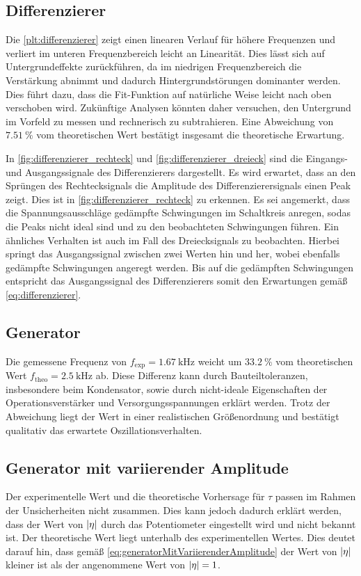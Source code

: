 \subsection{Differenzierer}
\label{sec:Differenzierer_Diskussion}
Die \autoref{plt:differenzierer} zeigt einen linearen Verlauf für höhere Frequenzen und verliert im unteren Frequenzbereich leicht an Linearität.
Dies lässt sich auf Untergrundeffekte zurückführen, da im niedrigen Frequenzbereich die Verstärkung abnimmt und dadurch Hintergrundstörungen dominanter werden.
Dies führt dazu, dass die Fit-Funktion auf natürliche Weise leicht nach oben verschoben wird.
Zukünftige Analysen könnten daher versuchen, den Untergrund im Vorfeld zu messen und rechnerisch zu subtrahieren.
Eine Abweichung von $\qty{7.51}{\percent}$ vom theoretischen Wert bestätigt insgesamt die theoretische Erwartung.

In \autoref{fig:differenzierer_rechteck} und
\autoref{fig:differenzierer_dreieck} sind die Eingangs-
und Ausgangssignale des Differenzierers dargestellt. Es wird erwartet, dass an den Sprüngen des
Rechtecksignals die Amplitude des Differenzierersignals einen Peak zeigt. Dies ist 
in \autoref{fig:differenzierer_rechteck} zu erkennen.
Es sei angemerkt, dass die Spannungsausschläge gedämpfte Schwingungen im Schaltkreis anregen, sodas
die Peaks nicht ideal sind und zu den beobachteten Schwingungen führen.
Ein ähnliches Verhalten ist auch im Fall des Dreiecksignals zu beobachten. Hierbei springt 
das Ausgangssignal zwischen zwei Werten hin und her, wobei ebenfalls gedämpfte Schwingungen
angeregt werden. Bis auf die gedämpften Schwingungen entspricht das Ausgangssignal des Differenzierers
somit den Erwartungen gemäß \autoref{eq:differenzierer}.

\subsection{Generator}
Die gemessene Frequenz von $f_\text{exp} = \qty{1.67}{\kilo\hertz}$ weicht um $\qty{33.2}{\percent}$ vom theoretischen Wert $f_\text{theo} = \qty{2.5}{\kilo\hertz}$ ab.  
Diese Differenz kann durch Bauteiltoleranzen, insbesondere beim Kondensator, sowie durch nicht-ideale Eigenschaften der Operationsverstärker und Versorgungsspannungen erklärt werden.  
Trotz der Abweichung liegt der Wert in einer realistischen Größenordnung und bestätigt qualitativ das erwartete Oszillationsverhalten.

\subsection{Generator mit variierender Amplitude}
\label{sec:Generator_Diskussion}
Der experimentelle Wert und die theoretische Vorhersage für $\tau$ passen im Rahmen der Unsicherheiten nicht zusammen.
Dies kann jedoch dadurch erklärt werden, dass der Wert von $\lvert\eta\rvert$ durch das Potentiometer eingestellt wird und nicht bekannt 
ist. Der theoretische Wert liegt unterhalb des experimentellen Wertes. Dies deutet darauf hin, 
dass gemäß \autoref{eq:generatorMitVariierenderAmplitude} der Wert von $\lvert\eta\rvert$ kleiner ist als der 
angenommene Wert von $\lvert\eta\rvert = 1$.